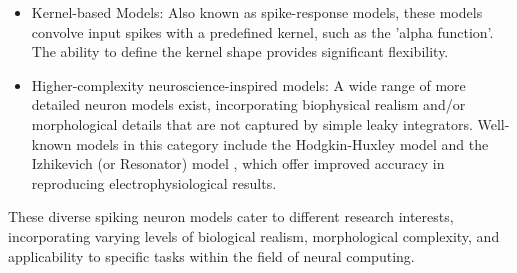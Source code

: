 \begin{itemize}
    \item Kernel-based Models: Also known as spike-response models, these models convolve input spikes with a predefined kernel, such as the 'alpha function'. The ability to define the kernel shape provides significant flexibility.

    \item Higher-complexity neuroscience-inspired models: A wide range of more detailed neuron models exist, incorporating biophysical realism and/or morphological details that are not captured by simple leaky integrators. Well-known models in this category include the Hodgkin-Huxley model \cite{hodgkin1952quantitative} and the Izhikevich (or Resonator) model \cite{izhikevich2003simple}, which offer improved accuracy in reproducing electrophysiological results.
    
\end{itemize}

These diverse spiking neuron models cater to different research interests, incorporating varying levels of biological realism, morphological complexity, and applicability to specific tasks within the field of neural computing.
